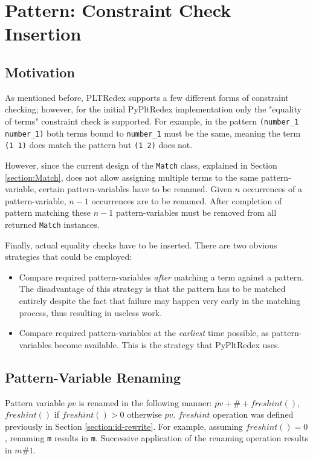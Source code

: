 \section{Pattern: Constraint Check Insertion}
\label{section:constraint-check}
\subsection{Motivation}
As mentioned before, PLTRedex supports a few different forms of constraint checking; however, for the initial PyPltRedex implementation only the "equality of terms" constraint check is supported. For example, in the pattern \texttt{(number\_1 number\_1)} both terms bound to \texttt{number\_1} must be the same, meaning the term \texttt{(1 1)} does match the pattern but \texttt{(1 2)} does not.

However, since the current design of the \texttt{Match} class, explained in Section \ref{section:Match}, does not allow assigning multiple terms to the same pattern-variable, certain pattern-variables have to be renamed. Given $n$ occurrences of a pattern-variable, $n-1$ occurrences are to be renamed. After completion of pattern matching these $n-1$ pattern-variables must be removed from all returned \texttt{Match} instances.

Finally, actual equality checks have to be inserted. There are two obvious strategies that could be employed:

\begin{itemize}
\item Compare required pattern-variables \textit{after} matching a term against a pattern. The disadvantage of this strategy is that the pattern has to be matched entirely despite the fact that failure may happen very early in the matching process, thus resulting in useless work.

\item Compare required pattern-variables at the \textit{earliest} time possible, as pattern-variables become available. This is the strategy that PyPltRedex uses.
\end{itemize}

\subsection{Pattern-Variable Renaming}
Pattern variable $pv$ is renamed in the following manner: $\mathit{pv + \# + freshint()}$, $\mathit{freshint()}$ if $\mathit{freshint() > 0}$ otherwise $pv$. $\mathit{freshint}$ operation was defined previously in Section \ref{section:id-rewrite}. For example, assuming $\mathit{freshint()=0}$, renaming \texttt{m} results in \texttt{m}. Successive application of the renaming operation results in \texttt{$m\#1$}.

